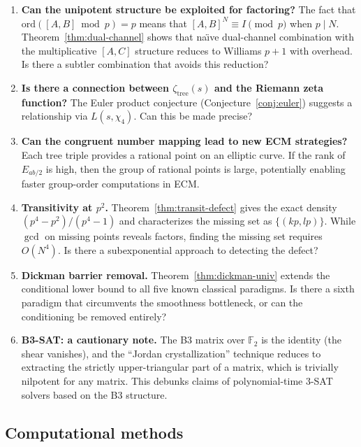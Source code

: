 \documentclass[12pt]{amsart}
\theoremstyle{definition}
\theoremstyle{remark}
\begin{document}
\begin{enumerate}
  \item \textbf{Can the unipotent structure be exploited for factoring?}  The
    fact that $\mathrm{ord}([A,B]\bmod p)=p$ means that $[A,B]^{N}\equiv I\pmod{p}$
    when $p\mid N$.  Theorem~\ref{thm:dual-channel} shows that na\"{\i}ve
    dual-channel combination with the multiplicative $[A,C]$ structure reduces
    to Williams $p{+}1$ with overhead.  Is there a subtler combination that
    avoids this reduction?

  \item \textbf{Is there a connection between $\zeta_{\mathrm{tree}}(s)$ and
    the Riemann zeta function?}  The Euler product conjecture
    (Conjecture~\ref{conj:euler}) suggests a relationship via $L(s,\chi_{4})$.
    Can this be made precise?

  \item \textbf{Can the congruent number mapping lead to new ECM strategies?}
    Each tree triple provides a rational point on an elliptic curve.  If
    the rank of $E_{ab/2}$ is high, then the group of rational points is large,
    potentially enabling faster group-order computations in ECM.

  \item \textbf{Transitivity at $p^{2}$.}  Theorem~\ref{thm:transit-defect}
    gives the exact density $(p^{4}-p^{2})/(p^{4}-1)$ and characterizes the
    missing set as $\{(kp,lp)\}$.  While $\gcd$ on missing points reveals
    factors, finding the missing set requires $O(N^{4})$.  Is there a
    subexponential approach to detecting the defect?

  \item \textbf{Dickman barrier removal.}  Theorem~\ref{thm:dickman-univ}
    extends the conditional lower bound to all five known classical paradigms.
    Is there a sixth paradigm that circumvents the smoothness bottleneck, or
    can the conditioning be removed entirely?

  \item \textbf{B3-SAT: a cautionary note.}  The B3 matrix over
    $\mathbb{F}_{2}$ is the identity (the shear vanishes), and the
    ``Jordan crystallization'' technique reduces to extracting the strictly
    upper-triangular part of a matrix, which is trivially nilpotent for any
    matrix.  This debunks claims of polynomial-time 3-SAT solvers based on the
    B3 structure.
\end{enumerate}

\subsection{Computational methods}
\end{document}

